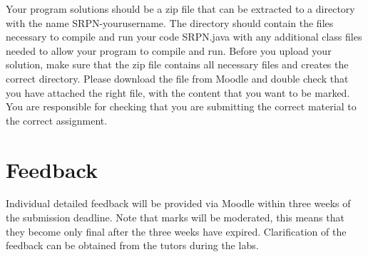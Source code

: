 \documentclass[12pt, oneside]{article}   	%
\begin{document}
Your program solutions should be a zip file that can be extracted to a directory with the name SRPN-yourusername. The directory should contain the files necessary to compile and run your code SRPN.java with any additional class files needed to allow your program to compile and run. Before you upload your solution, make sure that the zip file contains all necessary files and creates the correct directory. Please download the file from Moodle and double check that you have attached the right file, with the content that you want to be marked. You are responsible for checking that you are submitting the correct material to the correct assignment.

\section{Feedback}
Individual detailed feedback will be provided via Moodle within three weeks of the submission deadline. Note that marks will be moderated, this means that they become only final after the three weeks have expired. Clarification of the feedback can be obtained from the tutors during the labs.
\end{document}
